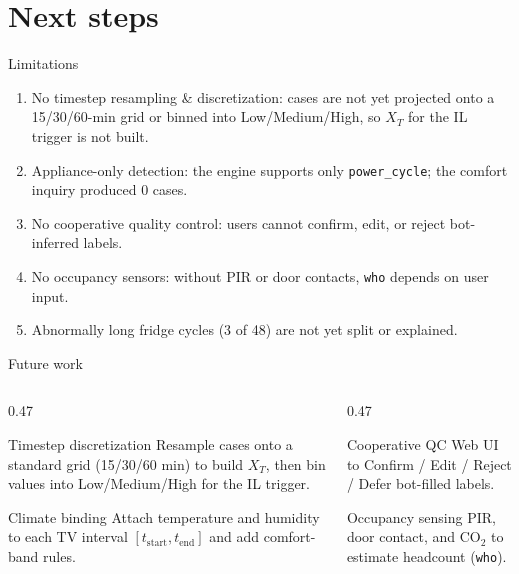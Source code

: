 \section{Next steps}

\begin{frame}{Limitations}
  \small
  \begin{enumerate}
    \item \alert{No timestep resampling \& discretization:} cases are not yet
          projected onto a 15/30/60-min grid or binned into Low/Medium/High, so
          $X_T$ for the IL trigger is not built.
    \item \alert{Appliance-only detection:} the engine supports only
          \texttt{power\_cycle}; the comfort inquiry produced 0 cases.
    \item \alert{No cooperative quality control:} users cannot confirm, edit, or
          reject bot-inferred labels.
    \item \alert{No occupancy sensors:} without PIR or door contacts,
          \texttt{who} depends on user input.
    \item \alert{Abnormally long fridge cycles} (3 of 48) are not yet split or
          explained.
  \end{enumerate}
\end{frame}

\begin{frame}{Future work}
  \footnotesize
  \begin{columns}[T,onlytextwidth]
    \begin{column}{0.47\textwidth}
      \begin{block}{Timestep discretization}
        Resample cases onto a standard grid (15/30/60 min) to build $X_T$, then
        bin values into Low/Medium/High for the IL trigger.
      \end{block}
      \begin{block}{Climate binding}
        Attach temperature and humidity to each TV interval
        $[t_{\mathrm{start}}, t_{\mathrm{end}}]$ and add comfort-band rules.
      \end{block}
    \end{column}
    \begin{column}{0.47\textwidth}
      \begin{block}{Cooperative QC}
        Web UI to Confirm / Edit / Reject / Defer bot-filled labels.
      \end{block}
      \begin{block}{Occupancy sensing}
        PIR, door contact, and CO$_2$ to estimate headcount (\texttt{who}).
      \end{block}
    \end{column}
  \end{columns}
\end{frame}

